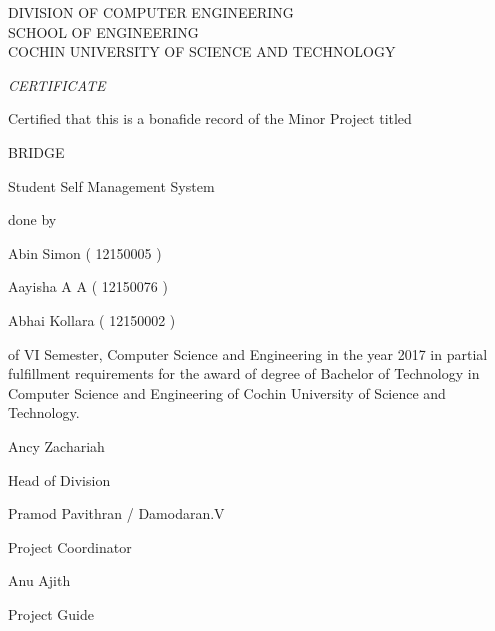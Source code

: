 \documentclass{article}
\begin{document}
\begin{center}

\LARGE
DIVISION OF COMPUTER ENGINEERING\\
SCHOOL OF ENGINEERING\\
COCHIN UNIVERSITY OF SCIENCE AND TECHNOLOGY\\

\hspace{1em}

\huge
\emph{CERTIFICATE}

\hspace{1em}

\large
Certified that this is a bonafide record of the Minor Project titled

\hspace{1em}

\LARGE
BRIDGE

\large
Student Self Management System

\hspace{1em}

done by

\hspace{1em}

\Large
Abin Simon ( 12150005 )

\Large
Aayisha A A ( 12150076 )

\Large
Abhai Kollara ( 12150002 )

\hspace{1em}

\large
of VI Semester, Computer Science and Engineering in the year 2017 in partial fulfillment requirements for the award of degree of Bachelor of Technology in Computer Science and Engineering of Cochin University of Science and Technology.

\hspace{1em}
\vspace{5em}

\begin{minipage}[b]{0.33333\textwidth}
\raggedright
Ancy Zachariah

Head of Division\\
\end{minipage}%
\begin{minipage}[b]{0.33333\textwidth}
\centering
Pramod Pavithran / Damodaran.V

Project Coordinator\\
\end{minipage}%
\begin{minipage}[b]{0.33333\textwidth}
\raggedleft
Anu Ajith

Project Guide\\
\end{minipage}



\end{center}
\end{document}
